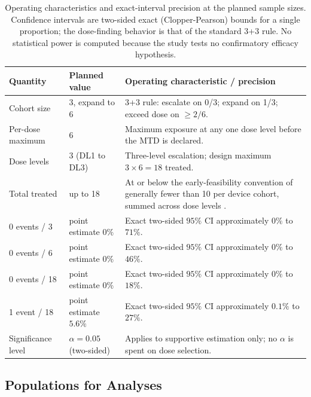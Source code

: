 \begin{table}[htbp]
\centering
\footnotesize
\caption{Operating characteristics and exact-interval precision at the planned
sample sizes. Confidence intervals are two-sided exact (Clopper-Pearson) bounds
for a single proportion; the dose-finding behavior is that of the standard 3+3
rule. No statistical power is computed because the study tests no confirmatory
efficacy hypothesis.}
\label{tab:opchar}
\begin{tabularx}{\textwidth}{L{2.6cm} L{3cm} Y}
\toprule
\textbf{Quantity} & \textbf{Planned value} & \textbf{Operating characteristic / precision} \\
\midrule
Cohort size & 3, expand to 6 & 3+3 rule: escalate on 0/3; expand on 1/3; exceed dose on $\geq 2/6$. \\
Per-dose maximum & 6 & Maximum exposure at any one dose level before the MTD is declared. \\
Dose levels & 3 (DL1 to DL3) & Three-level escalation; design maximum $3 \times 6 = 18$ treated. \\
Total treated & up to 18 & At or below the early-feasibility convention of generally fewer than 10 per device cohort, summed across dose levels \cite{fda2013earlyfeasibility}. \\
0 events / 3 & point estimate $0\%$ & Exact two-sided $95\%$ CI approximately $0\%$ to $71\%$. \\
0 events / 6 & point estimate $0\%$ & Exact two-sided $95\%$ CI approximately $0\%$ to $46\%$. \\
0 events / 18 & point estimate $0\%$ & Exact two-sided $95\%$ CI approximately $0\%$ to $18\%$. \\
1 event / 18 & point estimate $5.6\%$ & Exact two-sided $95\%$ CI approximately $0.1\%$ to $27\%$. \\
Significance level & $\alpha = 0.05$ (two-sided) & Applies to supportive estimation only; no $\alpha$ is spent on dose selection. \\
\bottomrule
\end{tabularx}
\end{table}

\subsection{Populations for Analyses}

